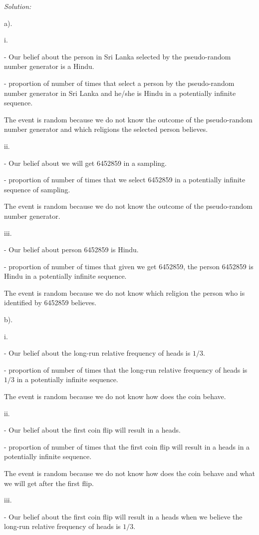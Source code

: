 \documentclass[a4paper, 11pt]{article}
\newenvironment{solution}
    {\textit{Solution:}}
    {}
\begin{document}
\begin{solution}

a).

i.

- Our belief about the person in Sri Lanka selected by the pseudo-random number generator is a Hindu.

- proportion of number of times that select a person by the pseudo-random number generator in Sri Lanka and he/she is Hindu in a potentially infinite sequence.

The event is random because we do not know the outcome of the pseudo-random number generator and which religions the selected person believes. 

ii.

- Our belief about we will get 6452859 in a sampling.

- proportion of number of times that we select 6452859 in a potentially infinite sequence of sampling.

The event is random because we do not know the outcome of the pseudo-random number generator.

iii.

- Our belief about person 6452859 is Hindu.

- proportion of number of times that given we get 6452859, the person 6452859 is Hindu in a potentially infinite sequence.

The event is random because we do not know which religion the person who is identified by 6452859  believes. 

b).

i.

- Our belief about the long-run relative frequency of heads is $1/3$.

- proportion of number of times that the long-run relative frequency of heads is $1/3$ in a potentially infinite sequence.

The event is random because we do not know how does the coin behave.

ii.

- Our belief about the first coin flip will result in a heads.

- proportion of number of times that the first coin flip will result in a heads in a potentially infinite sequence.

The event is random because we do not know how does the coin behave and what we will get after the first flip.

iii.

- Our belief about the first coin flip will result in a heads when we believe the long-run relative frequency of heads is $1/3$.


\end{solution}
\end{document}
